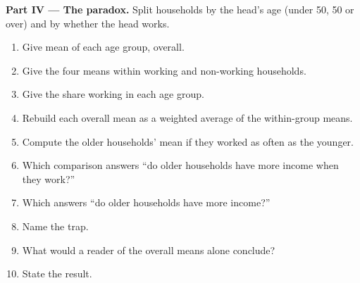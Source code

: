 \begin{problem}
\medskip\noindent\textbf{Part IV --- The paradox.} Split households by the
head's age (under 50, 50 or over) and by whether the head works.
\begin{enumerate}[resume]
  \item Give mean  of each age group, overall.
  \item Give the four means within working and non-working households.
  \item Give the share working in each age group.
  \item Rebuild each overall mean as a weighted average of the within-group means.
  \item Compute the older households' mean if they worked as often as the younger.
  \item Which comparison answers ``do older households have more income
    when they work?''
  \item Which answers ``do older households have more income?''
  \item Name the trap.
  \item What would a reader of the overall means alone conclude?
  \item State the result.
\end{enumerate}
\end{problem}
